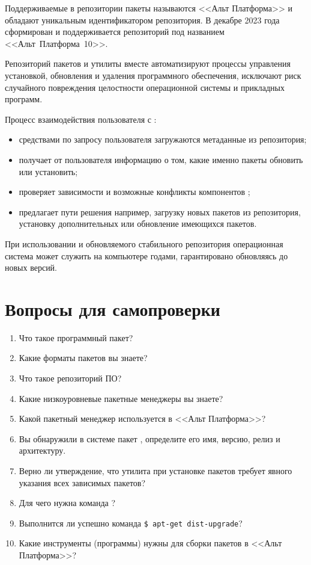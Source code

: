 Поддерживаемые в  репозитории пакеты называются <<Альт Платформа>> и обладают уникальным идентификатором
репозитория. В декабре 2023 года сформирован и поддерживается репозиторий  под названием <<Альт~Платформа~10>>.

Репозиторий пакетов и утилиты  вместе автоматизируют процессы управления установкой, обновления и удаления
программного обеспечения, исключают риск случайного повреждения целостности операционной системы и прикладных
программ.

Процесс взаимодействия пользователя с :
\begin{itemize}
	\item средствами  по запросу пользователя загружаются метаданные из репозитория;
	\item {} получает от пользователя информацию о том, какие именно пакеты обновить или установить;
	\item {} проверяет зависимости и возможные конфликты компонентов ;
	\item {} предлагает пути решения например, загрузку новых пакетов из репозитория, установку дополнительных или обновление имеющихся пакетов.
\end{itemize}


При использовании  и обновляемого стабильного репозитория операционная система может
служить на компьютере годами, гарантировано обновляясь до новых версий.

\section{Вопросы для самопроверки}

\begin{enumerate}
	\item Что такое программный пакет?
	\item Какие форматы пакетов вы знаете?
	\item Что такое репозиторий ПО?
	\item Какие низкоуровневые пакетные менеджеры вы знаете?
	\item Какой пакетный менеджер используется в <<Альт Платформа>>?
	\item Вы обнаружили в системе пакет , определите его имя, версию, релиз и архитектуру.
	\item Верно ли утверждение, что утилита  при установке пакетов требует явного указания всех зависимых пакетов?
	\item Для чего нужна команда ?
	\item Выполнится ли успешно команда \verb!$ apt-get dist-upgrade!?
	\item Какие инструменты (программы) нужны для сборки пакетов в <<Альт Платформа>>?
\end{enumerate}
